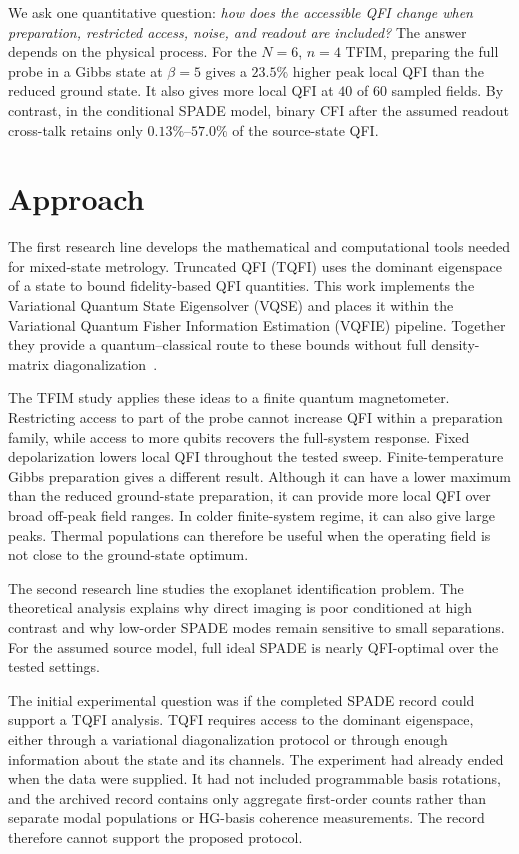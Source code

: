 We ask one quantitative question: \emph{how does the accessible QFI change when preparation, restricted access, noise, and readout are included?}  The answer depends on the physical process.  For the $N=6$, $n=4$ TFIM, preparing the full probe in a Gibbs state at $\beta=5$ gives a $23.5\%$ higher peak local QFI than the reduced ground state.  It also gives more local QFI at $40$ of $60$ sampled fields.  By contrast, in the conditional SPADE model, binary CFI after the assumed readout cross-talk retains only $0.13\%$--$57.0\%$ of the source-state QFI.

\section{Approach}

The first research line develops the mathematical and computational tools needed for mixed-state metrology.  Truncated QFI (TQFI) uses the dominant eigenspace of a state to bound fidelity-based QFI quantities.  This work implements the Variational Quantum State Eigensolver (VQSE) and places it within the Variational Quantum Fisher Information Estimation (VQFIE) pipeline.  Together they provide a quantum--classical route to these bounds without full density-matrix diagonalization~\cite{beckey2022vqfiea,cerezo2022vqse}.

The TFIM study applies these ideas to a finite quantum magnetometer.  Restricting access to part of the probe cannot increase QFI within a preparation family, while access to more qubits recovers the full-system response.  Fixed depolarization lowers local QFI throughout the tested sweep.  Finite-temperature Gibbs preparation gives a different result.  Although it can have a lower maximum than the reduced ground-state preparation, it can provide more local QFI over broad off-peak field ranges.  In colder finite-system regime, it can also give large peaks.  Thermal populations can therefore be useful when the operating field is not close to the ground-state optimum.

The second research line studies the exoplanet identification problem.  The theoretical analysis explains why direct imaging is poor conditioned at high contrast and why low-order SPADE modes remain sensitive to small separations.  For the assumed source model, full ideal SPADE is nearly QFI-optimal over the tested settings.

The initial experimental question was if the completed SPADE record could support a TQFI analysis.  TQFI requires access to the dominant eigenspace, either through a variational diagonalization protocol or through enough information about the state and its channels.  The experiment had already ended when the data were supplied.  It had not included programmable basis rotations, and the archived record contains only aggregate first-order counts rather than separate modal populations or HG-basis coherence measurements.  The record therefore cannot support the proposed protocol.


